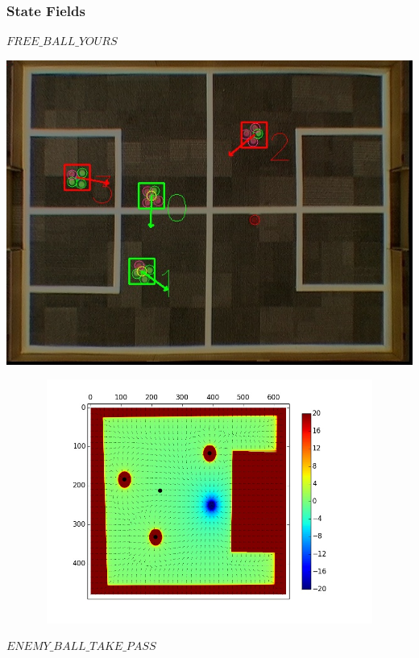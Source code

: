 \documentclass[a4paper,12pt]{article}
\begin{document}
\subsubsection{State Fields}
$FREE\_BALL\_YOURS$ \newline \newline
\begin{minipage}{0.4\textwidth}
\includegraphics[scale=0.3]{v3.jpg}
\end{minipage}
\begin{minipage}{0.4\textwidth}
\includegraphics[height=80mm,width=135mm]{p3.jpg}
\end{minipage}\newline\newline
$ENEMY\_BALL\_TAKE\_PASS$ \newline \newline
\end{document}
